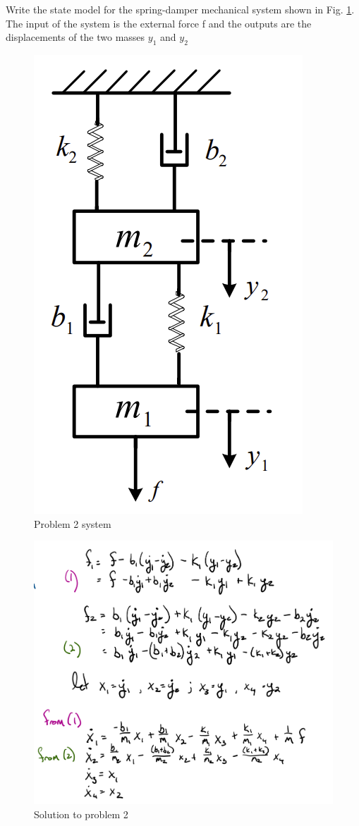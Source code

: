 \documentclass[11pt]{article}
\begin{document}
Write the state model for the spring-damper mechanical system shown in
Fig. \ref{fig:p2}. The input of the system is the external force f and the outputs are the
displacements of the two masses $y_1$ and $y_2$

\begin{figure}[h] 
    \centering
    \includegraphics[width=0.2 \linewidth]{p2}
    \caption{Problem 2 system}
    \label{fig:p2}
\end{figure}


\soln 


\begin{figure}[h] 
    \centering
    \includegraphics[width=0.5 \linewidth]{p2_soln}
    \caption{Solution to problem 2}
    \label{fig:p2_soln}
\end{figure}
\end{document}
